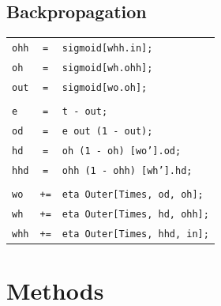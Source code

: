 \documentclass{beamer}
\begin{document}
\subsection{Backpropagation}
\begin{frame}
\begin{table}
\begin{tabular}{lcl}

\texttt{ohh}&\texttt{=} &\texttt{sigmoid[whh.in];}\\
\texttt{oh} &\texttt{=} &\texttt{sigmoid[wh.ohh];}\\
\texttt{out}&\texttt{=} &\texttt{sigmoid[wo.oh];}\\
&&\\
\texttt{e}  &\texttt{=} &\texttt{t - out;}\\
\texttt{od} &\texttt{=} &\texttt{e out (1 - out);}\\
\texttt{hd} &\texttt{=} &\texttt{oh (1 - oh) [wo'].od;}\\
\texttt{hhd}&\texttt{=} &\texttt{ohh (1 - ohh) [wh'].hd;}\\
&&\\
\texttt{wo} &\texttt{+=}&\texttt{eta Outer[Times, od, oh];}\\
\texttt{wh} &\texttt{+=}&\texttt{eta Outer[Times, hd, ohh];}\\
\texttt{whh}&\texttt{+=}&\texttt{eta Outer[Times, hhd, in];}
\end{tabular}
\end{table}

\end{frame}



\section{Methods}
\begin{frame}
  \tableofcontents
\end{frame}
\end{document}
